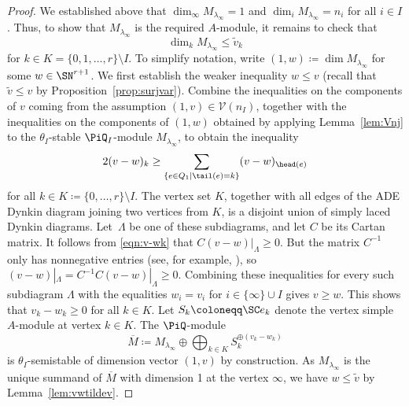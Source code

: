 \begin{proof}
 We established above that
 $\dim_\infty M_{\lambda_\infty} =1$ and $\dim_i M_{\lambda_\infty} = n_i$ for all $i\in I$.
 Thus, to show that $M_{\lambda_\infty}$ is the required $A$-module, it remains to check that
 \begin{equation*}%
 \dim_k M_{\lambda_\infty} \leq \widetilde{v}_k
 \end{equation*}
 for $k\in K=\{0,1,\dots,r\}\setminus I$.
 To simplify notation, write
 $(1,w)\coloneqq \dim M_{\lambda_\infty}$ for some $ w \in \SN^{r+1}$. We first establish the weaker inequality $ w \leq v$ (recall that $\widetilde{v} \leq v$ by Proposition~\ref{prop:surjvar}).
Combine the inequalities on the components of $v$ coming from the assumption $(1,v)\in \mathcal{V}(n_I)$, together with the inequalities on the components of $(1,w)$ obtained by applying Lemma~\ref{lem:Vnj} to the $\theta_I$-stable $\PiQ_I$-module $M_{\lambda_\infty}$, to obtain the inequality
 \begin{equation} \label{eqn:v-wk}
 2(v-w)_k \geq \sum_{\{e \in Q_1\mid \tail(e)=k\}} (v-w)_{\head(e)}
 \end{equation}
 for all $k \in K\coloneqq \{0,\dots,r\}\setminus I$.
 The vertex set $K$, together with all edges of the ADE Dynkin diagram joining two vertices from $K$, is
 a disjoint union of simply laced Dynkin diagrams. Let~$\Lambda$ be one of these subdiagrams, and let $C$ be its Cartan matrix. It follows from \eqref{eqn:v-wk} that $C(v-w)|_\Lambda\geq 0$. But the matrix $C^{-1}$ only has nonnegative entries (see, for example, \cite[equations~(1.157)--(1.158)]{Rosenfeld}), so $(v-w)|_\Lambda=C^{-1}C(v-w)|_\Lambda\ge 0$. Combining these inequalities for every such subdiagram $\Lambda$ with the equalities $ w_i=v_i$ for $i\in \{\infty\}\cup I$ gives $v\ge w$. This shows that $v_k-w_k\geq 0$ for all $k\in K$. Let $S_k\coloneqq\SC e_k$ denote the vertex simple $A$-module at vertex $k\in K$. The $\PiQ$-module
 \[
 \overline{M}\coloneqq M_{\lambda_\infty}\oplus \bigoplus_{k\in K}
 S_k^{\oplus (v_k-w_k)}
 \]
 is $\theta_I$-semistable of dimension vector $(1,v)$ by construction. As $M_{\lambda_\infty}$ is the unique summand of $\overline{M}$ with
dimension 1 at the vertex $\infty$, we have $w \leq \widetilde{v}$ by Lemma~\ref{lem:vwtildev}.
 \end{proof}

